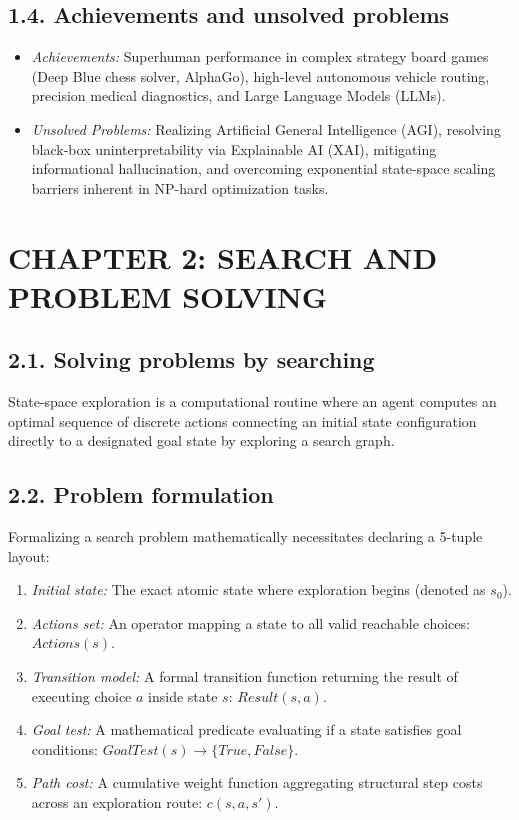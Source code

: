 \documentclass[11pt,a4paper]{article}
\begin{document}
\subsection{1.4. Achievements and unsolved problems}
\begin{itemize}
    \item \textit{Achievements:} Superhuman performance in complex strategy board games (Deep Blue chess solver, AlphaGo), high-level autonomous vehicle routing, precision medical diagnostics, and Large Language Models (LLMs).
    \item \textit{Unsolved Problems:} Realizing Artificial General Intelligence (AGI), resolving black-box uninterpretability via Explainable AI (XAI), mitigating informational hallucination, and overcoming exponential state-space scaling barriers inherent in NP-hard optimization tasks.
\end{itemize}

\section{CHAPTER 2: SEARCH AND PROBLEM SOLVING}

\subsection{2.1. Solving problems by searching}
State-space exploration is a computational routine where an agent computes an optimal sequence of discrete actions connecting an initial state configuration directly to a designated goal state by exploring a search graph.

\subsection{2.2. Problem formulation}
Formalizing a search problem mathematically necessitates declaring a 5-tuple layout:
\begin{enumerate}
    \item \textit{Initial state:} The exact atomic state where exploration begins (denoted as $s_0$).
    \item \textit{Actions set:} An operator mapping a state to all valid reachable choices: $Actions(s)$.
    \item \textit{Transition model:} A formal transition function returning the result of executing choice $a$ inside state $s$: $Result(s, a)$.
    \item \textit{Goal test:} A mathematical predicate evaluating if a state satisfies goal conditions: $GoalTest(s) \rightarrow \{True, False\}$.
    \item \textit{Path cost:} A cumulative weight function aggregating structural step costs across an exploration route: $c(s, a, s')$.
\end{enumerate}
\end{document}
